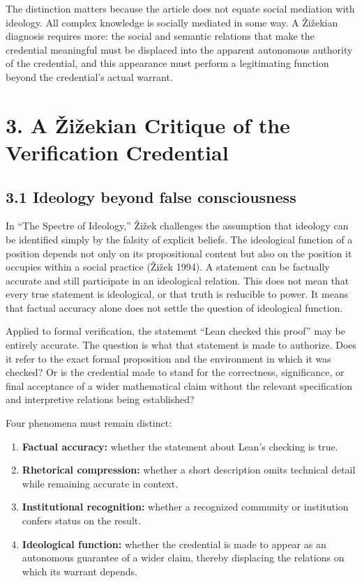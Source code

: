 \documentclass[sn-apa]{sn-jnl}
\begin{document}
The distinction matters because the article does not equate social mediation with ideology. All complex knowledge is socially mediated in some way. A Žižekian diagnosis requires more: the social and semantic relations that make the credential meaningful must be displaced into the apparent autonomous authority of the credential, and this appearance must perform a legitimating function beyond the credential’s actual warrant.

\section{3. A Žižekian Critique of the Verification Credential}

\subsection{3.1 Ideology beyond false consciousness}

In “The Spectre of Ideology,” Žižek challenges the assumption that ideology can be identified simply by the falsity of explicit beliefs. The ideological function of a position depends not only on its propositional content but also on the position it occupies within a social practice (Žižek 1994). A statement can be factually accurate and still participate in an ideological relation. This does not mean that every true statement is ideological, or that truth is reducible to power. It means that factual accuracy alone does not settle the question of ideological function.

Applied to formal verification, the statement “Lean checked this proof” may be entirely accurate. The question is what that statement is made to authorize. Does it refer to the exact formal proposition and the environment in which it was checked? Or is the credential made to stand for the correctness, significance, or final acceptance of a wider mathematical claim without the relevant specification and interpretive relations being established?

Four phenomena must remain distinct:

\begin{enumerate}

\item \textbf{Factual accuracy:} whether the statement about Lean’s checking is true.

\item \textbf{Rhetorical compression:} whether a short description omits technical detail while remaining accurate in context.

\item \textbf{Institutional recognition:} whether a recognized community or institution confers status on the result.

\item \textbf{Ideological function:} whether the credential is made to appear as an autonomous guarantee of a wider claim, thereby displacing the relations on which its warrant depends.

\end{enumerate}
\end{document}
